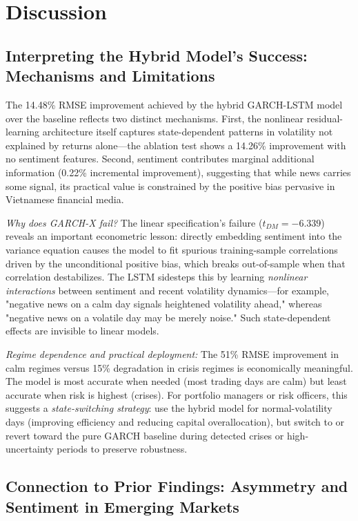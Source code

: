\section{Discussion}

\subsection{Interpreting the Hybrid Model's Success: Mechanisms and Limitations}

The 14.48\% RMSE improvement achieved by the hybrid GARCH-LSTM model over the baseline reflects two distinct mechanisms. First, the nonlinear residual-learning architecture itself captures state-dependent patterns in volatility not explained by returns alone—the ablation test shows a 14.26\% improvement with no sentiment features. Second, sentiment contributes marginal additional information (0.22\% incremental improvement), suggesting that while news carries some signal, its practical value is constrained by the positive bias pervasive in Vietnamese financial media.

\textit{Why does GARCH-X fail?} The linear specification's failure ($t_{DM} = -6.339$) reveals an important econometric lesson: directly embedding sentiment into the variance equation causes the model to fit spurious training-sample correlations driven by the unconditional positive bias, which breaks out-of-sample when that correlation destabilizes. The LSTM sidesteps this by learning \textit{nonlinear interactions} between sentiment and recent volatility dynamics—for example, "negative news on a calm day signals heightened volatility ahead," whereas "negative news on a volatile day may be merely noise." Such state-dependent effects are invisible to linear models.

\textit{Regime dependence and practical deployment:} The 51\% RMSE improvement in calm regimes versus 15\% degradation in crisis regimes is economically meaningful. The model is most accurate when needed (most trading days are calm) but least accurate when risk is highest (crises). For portfolio managers or risk officers, this suggests a \textit{state-switching strategy}: use the hybrid model for normal-volatility days (improving efficiency and reducing capital overallocation), but switch to or revert toward the pure GARCH baseline during detected crises or high-uncertainty periods to preserve robustness.

\subsection{Connection to Prior Findings: Asymmetry and Sentiment in Emerging Markets}

